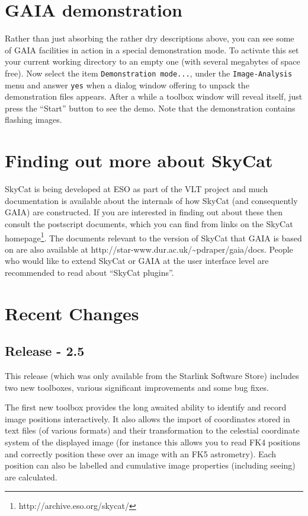 \documentclass[twoside,11pt]{article}
\newcommand{\htmladdnormallinkfoot}[2]{#1\footnote{#2}}
\newcommand{\htmladdnormallink}[2]{#1}
\newcommand{\xlabel}[1]{}
\renewcommand{\_}{\texttt{\symbol{95}}}
\newcommand{\mytt}[1]{{\texttt{#1}}}
\begin{document}
\section{\xlabel{gaia_demonstration}GAIA demonstration}
Rather than just absorbing the rather dry descriptions above, you can
see some of GAIA facilities in action in a special demonstration
mode. To activate this set your current working directory to an empty
one (with several megabytes of space free). Now select the item
\mytt{Demonstration mode...}, under the \mytt{Image-Analysis} menu and
answer \mytt{yes} when a dialog window offering to unpack the
demonstration files appears. After a while a toolbox window will
reveal itself, just press the ``Start'' button to see the demo. Note
that the demonstration contains flashing images.

\section{\xlabel{finding_out_more_about_skycat}Finding out more about SkyCat}
\htmladdnormallink{SkyCat}{http://archive.eso.org/skycat/} is being
developed at \htmladdnormallink{ESO}{http://www.eso.org/} as part of
the \htmladdnormallink{VLT}{http://www.eso.org/vlt/} project and much
documentation is available about the internals of how SkyCat (and
consequently GAIA) are constructed. If you are interested in finding
out about these then consult the postscript documents, which you can
find from links on the \htmladdnormallinkfoot{SkyCat
homepage}{http://archive.eso.org/skycat/}. The documents relevant to
the version of SkyCat that GAIA is based on are also available at
\htmladdnormallink{http://star-www.dur.ac.uk/\~{}pdraper/gaia/docs}
{http://star-www.dur.ac.uk/~pdraper/gaia/docs}. People who would like
to extend SkyCat or GAIA at the user interface level are recommended
to read about ``SkyCat plugins''.

\section{Recent \xlabel{changes}Changes}

\subsection{Release - 2.5}
  This release (which was only available from the Starlink Software
  Store) includes two new toolboxes, various significant improvements
  and some bug fixes. 

  The first new toolbox provides the long awaited ability to identify
  and record image positions interactively. It also allows the import
  of coordinates stored in text files (of various formats) and their
  transformation to the celestial coordinate system of the displayed
  image (for instance this allows you to read FK4 positions and
  correctly position these over an image with an FK5 astrometry). Each
  position can also be labelled and cumulative image properties
  (including seeing) are calculated.
\end{document}
